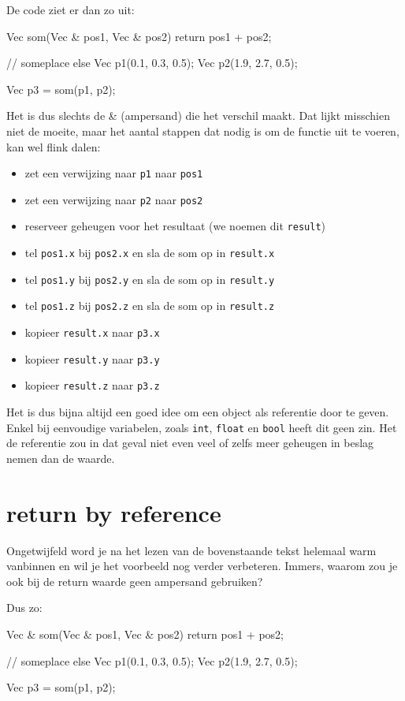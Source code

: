 De code ziet er dan zo uit:
\begin{code}
Vec som(Vec & pos1, Vec & pos2) {
  return pos1 + pos2;
}

// someplace else
Vec p1(0.1, 0.3, 0.5);
Vec p2(1.9, 2.7, 0.5);

Vec p3 = som(p1, p2); 
\end{code}

Het is dus slechts de \& (ampersand) die het verschil maakt. Dat lijkt misschien niet de moeite, maar het aantal stappen dat nodig is om de functie uit te voeren, kan wel flink dalen:

\begin{itemize}
\item zet een verwijzing naar \texttt{p1} naar \texttt{pos1}
\item zet een verwijzing naar \texttt{p2} naar \texttt{pos2}
\item reserveer geheugen voor het resultaat (we noemen dit \texttt{result})
\item tel \texttt{pos1.x} bij \texttt{pos2.x} en sla de som op in \texttt{result.x}
\item tel \texttt{pos1.y} bij \texttt{pos2.y} en sla de som op in \texttt{result.y}
\item tel \texttt{pos1.z} bij \texttt{pos2.z} en sla de som op in \texttt{result.z}
\item kopieer \texttt{result.x} naar \texttt{p3.x}
\item kopieer \texttt{result.y} naar \texttt{p3.y}
\item kopieer \texttt{result.z} naar \texttt{p3.z}
\end{itemize}

Het is dus bijna altijd een goed idee om een object als referentie door te geven. Enkel bij eenvoudige variabelen, zoals \texttt{int}, \texttt{float} en \texttt{bool} heeft dit geen zin. Het de referentie zou in dat geval niet even veel of zelfs meer geheugen in beslag nemen dan de waarde.

\section{return by reference}
Ongetwijfeld word je na het lezen van de bovenstaande tekst helemaal warm vanbinnen en wil je het voorbeeld nog verder verbeteren. Immers, waarom zou je ook bij de return waarde geen ampersand gebruiken?

Dus zo:
\begin{code}
Vec & som(Vec & pos1, Vec & pos2) {
  return pos1 + pos2;
}

// someplace else
Vec p1(0.1, 0.3, 0.5);
Vec p2(1.9, 2.7, 0.5);

Vec p3 = som(p1, p2); 
\end{code}

